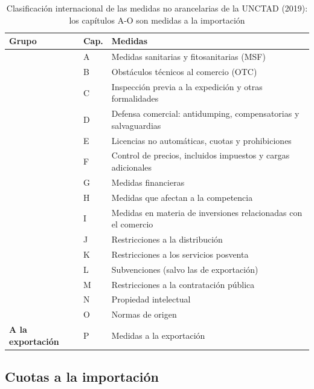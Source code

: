 \documentclass[11pt]{article}
\begin{document}
\begin{table}[H]
\centering
\caption{Clasificación internacional de las medidas no arancelarias de la UNCTAD (2019): los capítulos A-O son medidas a la importación}\label{tab:mast}
\small
\begin{tabular}{>{\centering\arraybackslash}m{3.0cm}>{\centering\arraybackslash}m{0.8cm}>{\raggedright\arraybackslash}m{9.8cm}}
\toprule
\rowcolor{tceeazulpalido}\textbf{Grupo} & \textbf{Cap.} & \textbf{Medidas}\\
\midrule
\multirow{3}{*}{\textcolor{tceeverde}{\textbf{Técnicas}}} & A & Medidas sanitarias y fitosanitarias (MSF)\\
 & B & Obstáculos técnicos al comercio (OTC)\\
 & C & Inspección previa a la expedición y otras formalidades\\
\midrule
\multirow{12}{*}{\textcolor{tceeazul}{\textbf{No técnicas}}} & D & Defensa comercial: antidumping, compensatorias y salvaguardias\\
 & E & Licencias no automáticas, cuotas y prohibiciones\\
 & F & Control de precios, incluidos impuestos y cargas adicionales\\
 & G & Medidas financieras\\
 & H & Medidas que afectan a la competencia\\
 & I & Medidas en materia de inversiones relacionadas con el comercio\\
 & J & Restricciones a la distribución\\
 & K & Restricciones a los servicios posventa\\
 & L & Subvenciones (salvo las de exportación)\\
 & M & Restricciones a la contratación pública\\
 & N & Propiedad intelectual\\
 & O & Normas de origen\\
\midrule
\textcolor{tceedorado}{\textbf{A la exportación}} & P & Medidas a la exportación\\
\bottomrule
\end{tabular}
\end{table}

\subsection{Cuotas a la importación}\label{sec:cuotas}
\end{document}
